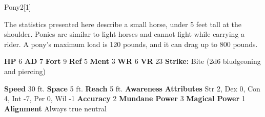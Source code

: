   \begin{monsection}{Pony}{2}[1]
    \vspace{-1em}\vspace{-1em}
    \vspace{0em}

    
      The statistics presented here describe a small horse, under 5 feet tall at the shoulder.
      Ponies are similar to light horses and cannot fight while carrying a rider.
      A pony's maximum load is 120 pounds, and it can drag up to 800 pounds.
    
    

    \begin{spellcontent}
      \begin{spelltargetinginfo}
        \pari \textbf{HP} 6 \monsep
          \textbf{AD} 7 \monsep
          \textbf{Fort} 9 \monsep
          \textbf{Ref} 5 \monsep
          \textbf{Ment} 3
        \pari \textbf{WR} 6 \monsep
        \textbf{VR} 23
        \pari \textbf{Strike:}
            Bite  (2d6 bludgeoning and piercing)
      \end{spelltargetinginfo}
    \end{spellcontent}
    \begin{monsterfooter}
      \pari \textbf{Speed} 30 ft. \monsep
        \textbf{Space} 5 ft. \monsep
        \textbf{Reach} 5 ft.
      \pari \textbf{Awareness} 
      \pari \textbf{Attributes}
        Str 2, Dex 0,
        Con 4, Int -7,
        Per 0, Wil -1
      \pari \textbf{Accuracy} 2 \monsep
        \textbf{Mundane Power} 3 \monsep
      \textbf{Magical Power} 1
      \pari \textbf{Alignment} Always true neutral
    \end{monsterfooter}
  \end{monsection}
  
